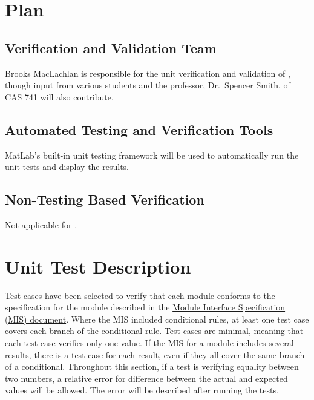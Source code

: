 \documentclass[12pt, titlepage]{article}
\begin{document}
\section{Plan} \label{sec_UnitPlan}
	
\subsection{Verification and Validation Team}

\noindent Brooks MacLachlan is responsible for the unit verification and 
validation of \progname{}, though input from various students and the 
professor, Dr.~Spencer Smith, of CAS 741 will also contribute.

\subsection{Automated Testing and Verification Tools}

\noindent MatLab's built-in unit testing framework will be used to 
automatically run the unit tests and display the results.

\subsection{Non-Testing Based Verification}

Not applicable for \progname{}.

\section{Unit Test Description} \label{sec_Tests}

\noindent Test cases have been selected to verify that each module conforms to 
the specification for the module described in the 
\href{https://github.com/smiths/caseStudies/blob/master/CaseStudies/ssp/docs/Design/MIS/MIS.pdf}
{Module Interface Specification (MIS) document}. Where the MIS included 
conditional rules, at least one test case covers each branch of the conditional 
rule. Test cases are minimal, meaning that each test case verifies only one 
value. If the MIS for a module includes several results, there is a test case 
for each result, even if they all cover the same branch of a conditional. 
Throughout this section, if a test is verifying equality between two numbers, a 
relative error for difference between the actual and expected values will 
be allowed. The error will be described after running the tests. 
\end{document}
